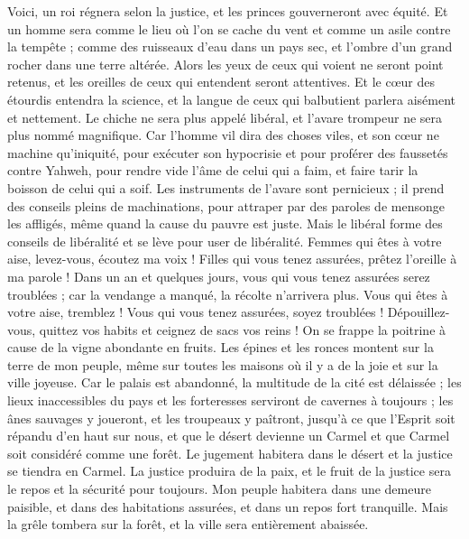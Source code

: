 \begin{multicols}{2}
\VerseOne{}Voici, un roi régnera selon la justice, et les princes gouverneront avec équité.
Et un homme sera comme le lieu où l'on se cache du vent et comme un asile contre la tempête ; comme des ruisseaux d'eau dans un pays sec, et l'ombre d'un grand rocher dans une terre altérée.
Alors les yeux de ceux qui voient ne seront point retenus, et les oreilles de ceux qui entendent seront attentives.
Et le cœur des étourdis entendra la science, et la langue de ceux qui balbutient parlera aisément et nettement.
Le chiche ne sera plus appelé libéral, et l'avare trompeur ne sera plus nommé magnifique.
Car l'homme vil dira des choses viles, et son cœur ne machine qu'iniquité, pour exécuter son hypocrisie et pour proférer des faussetés contre Yahweh, pour rendre vide l'âme de celui qui a faim, et faire tarir la boisson de celui qui a soif.
Les instruments de l'avare sont pernicieux ; il prend des conseils pleins de machinations, pour attraper par des paroles de mensonge les affligés, même quand la cause du pauvre est juste.
Mais le libéral forme des conseils de libéralité et se lève pour user de libéralité.
Femmes qui êtes à votre aise, levez-vous, écoutez ma voix ! Filles qui vous tenez assurées, prêtez l'oreille à ma parole !
Dans un an et quelques jours, vous qui vous tenez assurées serez troublées ; car la vendange a manqué, la récolte n'arrivera plus.
Vous qui êtes à votre aise, tremblez ! Vous qui vous tenez assurées, soyez troublées ! Dépouillez-vous, quittez vos habits et ceignez de sacs vos reins !
On se frappe la poitrine à cause de la vigne abondante en fruits.
Les épines et les ronces montent sur la terre de mon peuple, même sur toutes les maisons où il y a de la joie et sur la ville joyeuse.
Car le palais est abandonné, la multitude de la cité est délaissée ; les lieux inaccessibles du pays et les forteresses serviront de cavernes à toujours ; les ânes sauvages y joueront, et les troupeaux y paîtront,
jusqu'à ce que l'Esprit soit répandu d'en haut sur nous, et que le désert devienne un Carmel et que Carmel soit considéré comme une forêt.
Le jugement habitera dans le désert et la justice se tiendra en Carmel.
La justice produira de la paix, et le fruit de la justice sera le repos et la sécurité pour toujours.
Mon peuple habitera dans une demeure paisible, et dans des habitations assurées, et dans un repos fort tranquille.
Mais la grêle tombera sur la forêt, et la ville sera entièrement abaissée.

\end{multicols}
